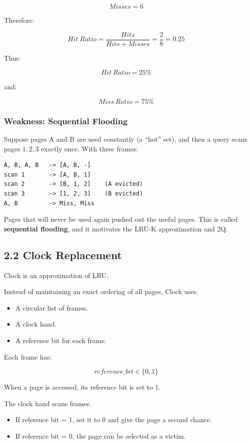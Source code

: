\documentclass[12pt,a4paper]{article}
\begin{document}
\[
Misses = 6
\]

Therefore:

\[
Hit\ Ratio =
\frac{Hits}{Hits+Misses}
=
\frac{2}{8}
=
0.25
\]

Thus:

\[
\boxed{Hit\ Ratio=25\%}
\]

and:

\[
\boxed{Miss\ Ratio=75\%}
\]

\subsubsection{Weakness: Sequential Flooding}

Suppose pages A and B are used constantly (a ``hot'' set), and then a query scans pages
$1, 2, 3$ exactly once. With three frames:

\begin{verbatim}
A, B, A, B   -> [A, B, -]
scan 1       -> [A, B, 1]
scan 2       -> [B, 1, 2]    (A evicted)
scan 3       -> [1, 2, 3]    (B evicted)
A, B         -> Miss, Miss
\end{verbatim}

Pages that will never be used again pushed out the useful pages. This is called
\textbf{sequential flooding}, and it motivates the LRU-K approximation and 2Q.

\subsection{2.2 Clock Replacement}

Clock is an approximation of LRU.

Instead of maintaining an exact ordering of all pages, Clock uses:

\begin{itemize}
    \item A circular list of frames.
    \item A clock hand.
    \item A reference bit for each frame.
\end{itemize}

Each frame has:

\[
reference\_bit \in \{0,1\}
\]

When a page is accessed, its reference bit is set to 1.

The clock hand scans frames.

\begin{itemize}
    \item If reference bit = 1, set it to 0 and give the page a second chance.
    \item If reference bit = 0, the page can be selected as a victim.
\end{itemize}
\end{document}
